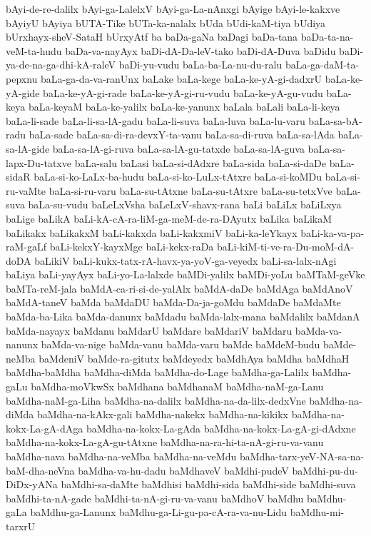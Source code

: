 {bAyi-de-re-dalilx
bAyi-ga-LalelxV
bAyi-ga-La-nAnxgi
bAyige
bAyi-le-kakxve
bAyiyU
bAyiya
bUTA-Tike
bUTa-ka-nalalx
bUda
bUdi-kaM-tiya
bUdiya
bUrxhayx-sheV-SataH
bUrxyAtf
ba
baDa-gaNa
baDagi
baDa-tana
baDa-ta-na-veM-ta-hudu
baDa-va-nayAyx
baDi-dA-Da-leV-tako
baDi-dA-Duva
baDidu
baDi-ya-de-na-ga-dhi-kA-raleV
baDi-yu-vudu
baLa-ba-La-nu-du-ralu
baLa-ga-daM-ta-pepxnu
baLa-ga-da-va-ranUnx
baLake
baLa-kege
baLa-ke-yA-gi-dadxrU
baLa-ke-yA-gide
baLa-ke-yA-gi-rade
baLa-ke-yA-gi-ru-vudu
baLa-ke-yA-gu-vudu
baLa-keya
baLa-keyaM
baLa-ke-yalilx
baLa-ke-yanunx
baLala
baLali
baLa-li-keya
baLa-li-sade
baLa-li-sa-lA-gadu
baLa-li-suva
baLa-luva
baLa-lu-varu
baLa-sa-bA-radu
baLa-sade
baLa-sa-di-ra-devxY-ta-vanu
baLa-sa-di-ruva
baLa-sa-lAda
baLa-sa-lA-gide
baLa-sa-lA-gi-ruva
baLa-sa-lA-gu-tatxde
baLa-sa-lA-guva
baLa-sa-lapx-Du-tatxve
baLa-salu
baLasi
baLa-si-dAdxre
baLa-sida
baLa-si-daDe
baLa-sidaR
baLa-si-ko-LaLx-ba-hudu
baLa-si-ko-LuLx-tAtxre
baLa-si-koMDu
baLa-si-ru-vaMte
baLa-si-ru-varu
baLa-su-tAtxne
baLa-su-tAtxre
baLa-su-tetxVve
baLa-suva
baLa-su-vudu
baLeLxVsha
baLeLxV-shavx-rana
baLi
baLiLx
baLiLxya
baLige
baLikA
baLi-kA-cA-ra-liM-ga-meM-de-ra-DAyutx
baLika
baLikaM
baLikakx
baLikakxM
baLi-kakxda
baLi-kakxmiV
baLi-ka-leYkayx
baLi-ka-va-pa-raM-gaLf
baLi-kekxY-kayxMge
baLi-kekx-raDa
baLi-kiM-ti-ve-ra-Du-moM-dA-doDA
baLikiV
baLi-kukx-tatx-rA-havx-ya-yoV-ga-veyedx
baLi-sa-lalx-nAgi
baLiya
baLi-yayAyx
baLi-yo-La-lalxde
baMDi-yalilx
baMDi-yoLu
baMTaM-geVke
baMTa-reM-jala
baMdA-ca-ri-si-de-yalAlx
baMdA-daDe
baMdAga
baMdAnoV
baMdA-taneV
baMda
baMdaDU
baMda-Da-ja-goMdu
baMdaDe
baMdaMte
baMda-ba-Lika
baMda-danunx
baMdadu
baMda-lalx-mana
baMdalilx
baMdanA
baMda-nayayx
baMdanu
baMdarU
baMdare
baMdariV
baMdaru
baMda-va-nanunx
baMda-va-nige
baMda-vanu
baMda-varu
baMde
baMdeM-budu
baMde-neMba
baMdeniV
baMde-ra-gitutx
baMdeyedx
baMdhAya
baMdha
baMdhaH
baMdha-baMdha
baMdha-diMda
baMdha-do-Lage
baMdha-ga-Lalilx
baMdha-gaLu
baMdha-moVkwSx
baMdhana
baMdhanaM
baMdha-naM-ga-Lanu
baMdha-naM-ga-Liha
baMdha-na-dalilx
baMdha-na-da-lilx-dedxVne
baMdha-na-diMda
baMdha-na-kAkx-gali
baMdha-nakekx
baMdha-na-kikikx
baMdha-na-kokx-La-gA-dAga
baMdha-na-kokx-La-gAda
baMdha-na-kokx-La-gA-gi-dAdxne
baMdha-na-kokx-La-gA-gu-tAtxne
baMdha-na-ra-hi-ta-nA-gi-ru-va-vanu
baMdha-nava
baMdha-na-veMba
baMdha-na-veMdu
baMdha-tarx-yeV-NA-sa-na-baM-dha-neVna
baMdha-va-hu-dadu
baMdhaveV
baMdhi-pudeV
baMdhi-pu-du-DiDx-yANa
baMdhi-sa-daMte
baMdhisi
baMdhi-sida
baMdhi-side
baMdhi-suva
baMdhi-ta-nA-gade
baMdhi-ta-nA-gi-ru-va-vanu
baMdhoV
baMdhu
baMdhu-gaLa
baMdhu-ga-Lanunx
baMdhu-ga-Li-gu-pa-cA-ra-va-nu-Lidu
baMdhu-mi-tarxrU
}
